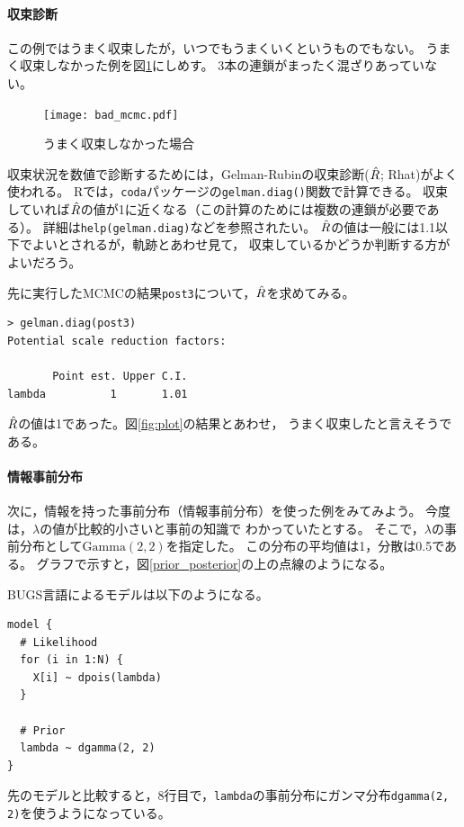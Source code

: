 \documentclass[11pt,uplatex]{jsarticle}
\begin{document}
\paragraph{収束診断}
この例ではうまく収束したが，いつでもうまくいくというものでもない。
うまく収束しなかった例を図\ref{bad_mcmc}にしめす。
3本の連鎖がまったく混ざりあっていない。
\begin{figure}[htbp]
	\begin{center}
		\texttt{[image: bad\_mcmc.pdf]}
	\end{center}
	\caption{うまく収束しなかった場合}
	\label{bad_mcmc}
\end{figure}

収束状況を数値で診断するためには，Gelman-Rubinの収束診断($\Hat{R}$; Rhat)がよく使われる。
\textsf{R}では，\texttt{coda}パッケージの\texttt{gelman.diag()}関数で計算できる。
収束していれば$\Hat{R}$の値が1に近くなる（この計算のためには複数の連鎖が必要である）。
詳細は\texttt{help(gelman.diag)}などを参照されたい。
$\Hat{R}$の値は一般には1.1以下でよいとされるが，軌跡とあわせ見て，
収束しているかどうか判断する方がよいだろう。

先に実行したMCMCの結果\texttt{post3}について，$\Hat{R}$を求めてみる。
\begin{lstlisting}
> gelman.diag(post3)
Potential scale reduction factors:

       Point est. Upper C.I.
lambda          1       1.01

\end{lstlisting}
$\Hat{R}$の値は1であった。図\ref{fig:plot}の結果とあわせ，
うまく収束したと言えそうである。

\paragraph{情報事前分布}

次に，情報を持った事前分布（情報事前分布）を使った例をみてみよう。
今度は，$\lambda$の値が比較的小さいと事前の知識で
わかっていたとする。
そこで，$\lambda$の事前分布として$\mathrm{Gamma}(2, 2)$を指定した。
この分布の平均値は1，分散は0.5である。
グラフで示すと，図\ref{prior_posterior}の上の点線のようになる。

\textsf{BUGS}言語によるモデルは以下のようになる。
\begin{lstlisting}
model {
  # Likelihood
  for (i in 1:N) {
    X[i] ~ dpois(lambda)
  }

  # Prior
  lambda ~ dgamma(2, 2)
}
\end{lstlisting}
先のモデルと比較すると，8行目で，\texttt{lambda}の事前分布にガンマ分布\texttt{dgamma(2, 2)}を使うようになっている。
\end{document}
